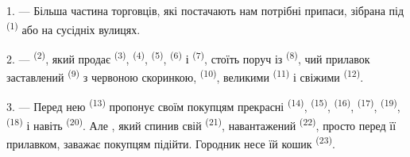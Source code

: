 %

\VUsaut{4.0mm}
\VUsaut{3.0mm}

\VUsaut{3.0mm}

1. --- Більша частина торговців, які постачають нам потрібні припаси, зібрана
під  \textsuperscript{(1)}  або на
сусідніх вулицях.

2. ---  \textsuperscript{(2)}, який продає 
\textsuperscript{(3)},  \textsuperscript{(4)},
 \textsuperscript{(5)}, 
\textsuperscript{(6)} і  \textsuperscript{(7)}, стоїть поруч із
 \textsuperscript{(8)}, чий прилавок заставлений
 \textsuperscript{(9)} з червоною скоринкою,
 \textsuperscript{(10)}, великими 
\textsuperscript{(11)} і свіжими  \textsuperscript{(12)}.

3. --- Перед нею  \textsuperscript{(13)} пропонує своїм
покупцям прекрасні  \textsuperscript{(14)},  \textsuperscript{(15)},  \textsuperscript{(16)},
 \textsuperscript{(17)}, 
\textsuperscript{(19)},  \textsuperscript{(18)} і навіть
 \textsuperscript{(20)}. Але , який спинив свій
 \textsuperscript{(21)}, навантажений  \textsuperscript{(22)}, просто перед її прилавком, заважає покупцям
підійти. Городник несе їй кошик  \textsuperscript{(23)}.

\VUsaut{4.0mm}
\VUsaut{3.0mm}

